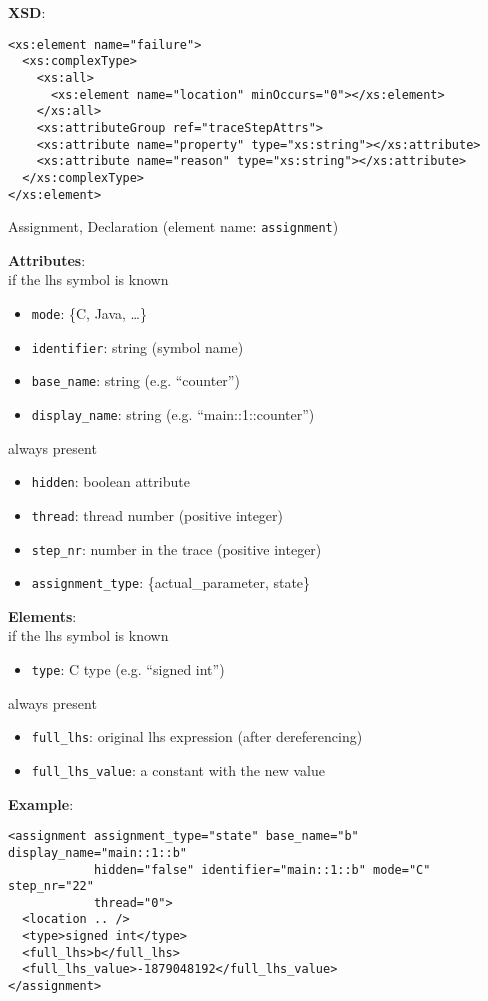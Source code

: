 \documentclass[12pt]{article}
\begin{document}
\noindent\textbf{XSD}:
\begin{verbatim}
<xs:element name="failure">
  <xs:complexType>
    <xs:all>
      <xs:element name="location" minOccurs="0"></xs:element>
    </xs:all>
    <xs:attributeGroup ref="traceStepAttrs">
    <xs:attribute name="property" type="xs:string"></xs:attribute>
    <xs:attribute name="reason" type="xs:string"></xs:attribute>
  </xs:complexType>
</xs:element>
\end{verbatim}


\begin{center}
{\Large Assignment, Declaration} (element name: \texttt{assignment})
\end{center}

\noindent\textbf{Attributes}:\\
if the lhs symbol is known
\begin{itemize}
\item \texttt{mode}: \{C, Java, …\}
\item \texttt{identifier}: string (symbol name)
\item \texttt{base\_name}: string (e.g. ``counter'')
\item \texttt{display\_name}: string (e.g. ``main::1::counter'')
\end{itemize}
always present
\begin{itemize}
\item \texttt{hidden}: boolean attribute
\item \texttt{thread}: thread number (positive integer)
\item \texttt{step\_nr}: number in the trace (positive integer)
\item \texttt{assignment\_type}: \{actual\_parameter, state\}
\end{itemize}

\noindent\textbf{Elements}:\\
if the lhs symbol is known
\begin{itemize}
\item \texttt{type}: C type (e.g. ``signed int'')
\end{itemize}
always present
\begin{itemize}
\item \texttt{full\_lhs}: original lhs expression (after dereferencing)
\item \texttt{full\_lhs\_value}: a constant with the new value
\end{itemize}

\noindent\textbf{Example}:
\begin{verbatim}
<assignment assignment_type="state" base_name="b" display_name="main::1::b"
            hidden="false" identifier="main::1::b" mode="C" step_nr="22"
            thread="0">
  <location .. />
  <type>signed int</type>
  <full_lhs>b</full_lhs>
  <full_lhs_value>-1879048192</full_lhs_value>
</assignment>
\end{verbatim}
\end{document}
